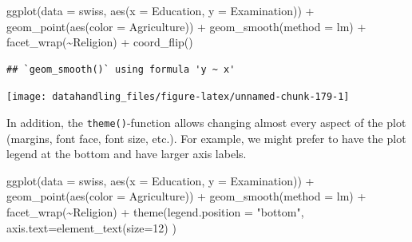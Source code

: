 \documentclass[
  12pt,
]{style/krantz}
\newenvironment{Shaded}{\begin{snugshade}}{\end{snugshade}}
\newcommand{\AttributeTok}[1]{\textcolor[rgb]{0.77,0.63,0.00}{#1}}
\newcommand{\DecValTok}[1]{\textcolor[rgb]{0.00,0.00,0.81}{#1}}
\newcommand{\FunctionTok}[1]{\textcolor[rgb]{0.00,0.00,0.00}{#1}}
\newcommand{\NormalTok}[1]{#1}
\newcommand{\SpecialCharTok}[1]{\textcolor[rgb]{0.00,0.00,0.00}{#1}}
\newcommand{\StringTok}[1]{\textcolor[rgb]{0.31,0.60,0.02}{#1}}
\begin{document}
\begin{Shaded}
\begin{Highlighting}[]
\FunctionTok{ggplot}\NormalTok{(}\AttributeTok{data =}\NormalTok{ swiss, }\FunctionTok{aes}\NormalTok{(}\AttributeTok{x =}\NormalTok{ Education, }\AttributeTok{y =}\NormalTok{ Examination)) }\SpecialCharTok{+}
     \FunctionTok{geom\_point}\NormalTok{(}\FunctionTok{aes}\NormalTok{(}\AttributeTok{color =}\NormalTok{ Agriculture)) }\SpecialCharTok{+}
     \FunctionTok{geom\_smooth}\NormalTok{(}\AttributeTok{method =} \StringTok{\textquotesingle{}lm\textquotesingle{}}\NormalTok{) }\SpecialCharTok{+}
     \FunctionTok{facet\_wrap}\NormalTok{(}\SpecialCharTok{\textasciitilde{}}\NormalTok{Religion) }\SpecialCharTok{+}
     \FunctionTok{coord\_flip}\NormalTok{()}
\end{Highlighting}
\end{Shaded}

\begin{verbatim}
## `geom_smooth()` using formula 'y ~ x'
\end{verbatim}

\texttt{[image: datahandling\_files/figure-latex/unnamed-chunk-179-1]}

In addition, the \texttt{theme()}-function allows changing almost every aspect of the plot (margins, font face, font size, etc.). For example, we might prefer to have the plot legend at the bottom and have larger axis labels.

\begin{Shaded}
\begin{Highlighting}[]
\FunctionTok{ggplot}\NormalTok{(}\AttributeTok{data =}\NormalTok{ swiss, }\FunctionTok{aes}\NormalTok{(}\AttributeTok{x =}\NormalTok{ Education, }\AttributeTok{y =}\NormalTok{ Examination)) }\SpecialCharTok{+}
     \FunctionTok{geom\_point}\NormalTok{(}\FunctionTok{aes}\NormalTok{(}\AttributeTok{color =}\NormalTok{ Agriculture)) }\SpecialCharTok{+}
     \FunctionTok{geom\_smooth}\NormalTok{(}\AttributeTok{method =} \StringTok{\textquotesingle{}lm\textquotesingle{}}\NormalTok{) }\SpecialCharTok{+}
     \FunctionTok{facet\_wrap}\NormalTok{(}\SpecialCharTok{\textasciitilde{}}\NormalTok{Religion) }\SpecialCharTok{+}
     \FunctionTok{theme}\NormalTok{(}\AttributeTok{legend.position =} \StringTok{"bottom"}\NormalTok{, }\AttributeTok{axis.text=}\FunctionTok{element\_text}\NormalTok{(}\AttributeTok{size=}\DecValTok{12}\NormalTok{) )}
\end{Highlighting}
\end{Shaded}
\end{document}
